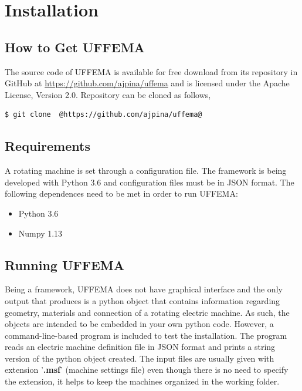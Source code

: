 \documentclass{tufte-book} %
\begin{document}
\mainmatter



\chapter{Installation}
\label{ch:1}

\section{How to Get UFFEMA}
The source code of UFFEMA is available for free download from its repository in GitHub at \url{https://github.com/ajpina/uffema} and is licensed under the Apache License, Version 2.0. Repository can be cloned as follows,

\begin{lstlisting}[language=bash, escapeinside=@@]
$ git clone  @https://github.com/ajpina/uffema@
\end{lstlisting}

\section{Requirements}
A rotating machine is set through a configuration file. The framework is being developed with Python 3.6 and configuration files must be in JSON format. The following dependences need to be met in order to run UFFEMA:

\begin{itemize}
\item Python 3.6
\item Numpy 1.13
\end{itemize}

\section{Running UFFEMA}
Being a framework, UFFEMA does not have graphical interface and the only output that produces is a python object that contains information regarding geometry, materials and connection of a rotating electric machine. As such, the objects are intended to be embedded in your own python code. However, a command-line-based  program is included to test the installation. The program reads an electric machine definition file in JSON format and prints a string version of the python object created. The input files are usually given with extension '\textbf{.msf}' (machine settings file) even though there is no need to specify the extension, it helps to keep the machines organized in the working folder. 
\end{document}
